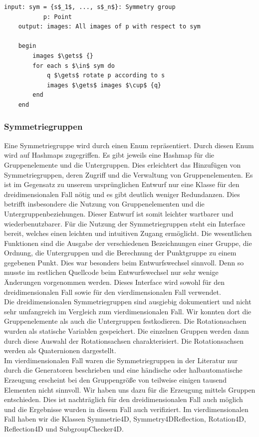         \begin{lstlisting}[mathescape, morekeywords={for, each, do, begin,input, output, end, return}, caption={Peusdocode der Bildmengenberechnung}, label=alg:images]
    input: sym = {s$_1$, ..., s$_n$}: Symmetry group
           p: Point
    output: images: All images of p with respect to sym
    
    begin
        images $\gets$ {}
        for each s $\in$ sym do
            q $\gets$ rotate p according to s
            images $\gets$ images $\cup$ {q}
        end
    end
        \end{lstlisting}
    \subsubsection{Symmetriegruppen}
    Eine Symmetriegruppe wird durch einen Enum repräsentiert. Durch diesen Enum wird auf Hashmaps zugegriffen. Es gibt jeweils eine Hashmap für die Gruppenelemente und die Untergruppen. Dies erleichtert das Hinzufügen von Symmetriegruppen, deren Zugriff und die Verwaltung von Gruppenelementen. Es ist im Gegensatz zu unserem ursprünglichen Entwurf nur eine Klasse für den dreidimensionalen Fall nötig und es gibt deutlich weniger Redundanzen. Dies betrifft insbesondere die Nutzung von Gruppenelementen und die Untergruppenbeziehungen. Dieser Entwurf ist somit leichter wartbarer und wiederbenutzbarer.
    Für die Nutzung der Symmetriegruppen steht ein Interface bereit, welches einen leichten und intuitiven Zugang ermöglicht. Die wesentlichen Funktionen sind die Ausgabe der verschiedenen Bezeichnungen einer Gruppe, die Ordnung, die Untergruppen und die Berechnung der Punktgruppe zu einem gegebenen Punkt. Dies war besonders beim Entwurfswechsel sinnvoll. Denn so musste im restlichen Quellcode beim Entwurfswechsel nur sehr wenige Änderungen vorgenommen werden. Dieses Interface wird sowohl für den dreidimensionalen Fall sowie für den vierdimensionalen Fall verwendet.\\ 
    Die dreidimensionalen Symmetriegruppen sind ausgiebig dokumentiert und nicht sehr umfangreich im Vergleich zum vierdimensionalen Fall. Wir konnten dort die Gruppenelemente als auch die Untergruppen festkodieren. Die Rotationsachsen wurden als statische Variablen gespeichert. Die einzelnen Gruppen werden dann durch diese Auswahl der Rotationsachsen charakterisiert. Die Rotationsachsen werden als Quaternionen dargestellt. \\
Im vierdimensionalen Fall waren die Symmetriegruppen in der Literatur nur durch die Generatoren beschrieben und eine händische oder halbautomatische Erzeugung erscheint bei den Gruppengröße von teilweise einigen tausend Elementen nicht sinnvoll. Wir haben uns dazu für die Erzeugung mittels Gruppen entschieden. Dies ist nachträglich für den dreidimensionalen Fall auch möglich und die Ergebnisse wurden in diesem Fall auch verifiziert. Im vierdimensionalen Fall haben wir die Klassen Symmetrie4D, Symmetry4DReflection, Rotation4D, Reflection4D und SubgroupChecker4D.
